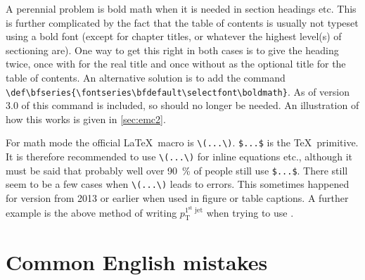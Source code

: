 A perennial problem is bold math when it is needed in
section headings etc. This is further complicated by the fact that the
table of contents is usually not typeset using a bold font (except for
chapter titles, or whatever the highest level(s) of sectioning are). %
One way to get this right in both cases is to give the
heading twice, once with  for the real title and once
without as the optional title for the table of contents.
An alternative solution is to add the command\\
\verb|\def\bfseries{\fontseries\bfdefault\selectfont\boldmath}|.
As of version 3.0 of  this command is included,
so  should no longer be needed.
An illustration of how this works is given in \cref{sec:emc2}.

For math mode the official \LaTeX\ macro is \verb|\(...\)|.
\verb|$...$| is the \TeX\ primitive.
It is therefore recommended to use \verb|\(...\)| for inline equations etc.,
although it must be said that probably well over \SI{90}{\%} of people still use \verb|$...$|.
There still seem to be a few cases when \verb|\(...\)| leads to errors.
This sometimes happened for \TeXLive version from 2013 or earlier
when used in figure or table captions.
A further example is the above method of writing
\(p_{\text{T}}^{1^{\text{st}}\text{ jet}}\)
when trying to use .

\section{Common English mistakes}%
\label{sec:tips:english}


